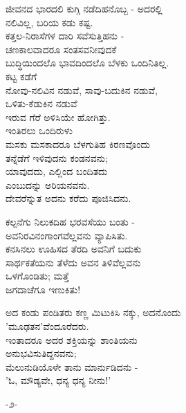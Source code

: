 \begin{myquote}
ಜೀವನದ ಭಾರದಲಿ ಕುಗ್ಗಿ ನಡೆದಿಹನೊಬ್ಬ - ಅದರಲ್ಲಿ\\ನಲಿವಿಲ್ಲ, ಬರಿಯ ಕಡು ಕಷ್ಟ.\\ಕತ್ತಲ-ನಿರಾಸೆಗಳ ದಾರಿ ಸವೆಸುತ್ತಿಹನು -\\ಚಣಕಾಲವಾದರೂ ಸಂತಸವನೀವುದಕೆ\\ಬುದ್ಧಿಯಿಂದಲೊ ಭಾವದಿಂದಲೊ ಬೆಳಕು ಒಂದಿನಿತಿಲ್ಲ.\\ಕಟ್ಟ ಕಡೆಗೆ\\ನೋವು-ನಲಿವಿನ ನಡುವೆ, ಸಾವು-ಬದುಕಿನ ನಡುವೆ,\\ಒಳಿತು-ಕೆಡುಕಿನ ನಡುವೆ\\ಇರುವ ಗೆರೆ ಅಳಿಸಿಯೇ ಹೋಗಿತ್ತು.\\ಇಂತಿರಲು ಒಂದಿರುಳು\\ಮಸಕು ಮಸಕಾದರೂ ಬೆಳಗುತಿಹ ಕಿರಣವೊಂದು\\ತನ್ನೆಡೆಗೆ ಇಳಿವುದನು ಕಂಡನವನು;\\ಯಾವುದದು, ಎಲ್ಲಿಂದ ಬಂದಿತದು\\ಎಂಬುದನ್ನು ಅರಿಯನವನು.\\ದೇವರೆನ್ನುತ ಅದನು ಕರೆದು ಪೂಜಿಸಿದನು.
\end{myquote}

\begin{myquote}
ಕಲ್ಪನೆಗು ನಿಲುಕದಿಹ ಭರವಸೆಯು ಬಂತು -\\ಅವನಿರವಿನಂಗಾಂಗವೆಲ್ಲವನು ವ್ಯಾಪಿಸಿತು.\\ಕನಸಿನಲು ಊಹಿಸದ ತೆರದಿ ಅವನಿಗೆ ಬದುಕು\\ಸಾರ್ಥಕತೆಯನು ತೆಳೆದು ಅವನ ತಿಳಿವೆಲ್ಲವನು\\ಒಳಗೊಂಡಿತು; ಮತ್ತೆ\\ಜಗದಾಚೆಗೂ ಇಣುಕಿತು!
\end{myquote}

\begin{myquote}
ಅದ ಕಂಡು ಪಂಡಿತರು ಕಣ್ಣ ಮಿಟುಕಿಸಿ ನಕ್ಕು, ಅದನೊಂದು\\'ಮೂಢತನ'ವೆಂದೂರೆದರು.\\ಇಂತಾದರೂ ಅದರ ಶಕ್ತಿಯನ್ನು ಶಾಂತಿಯನು\\ಅನುಭವಿಸುತಿದ್ದನವನು;\\ಮೆಲುನುಡಿಯೊಳೇ ತಾನು ಮಾರ್ನುಡಿದನು -\\'ಓ, ಮೌಡ್ಯವೇ, ಧನ್ಯ ಧನ್ಯ ನೀನು!'
\end{myquote}

\begin{center}
-೨-
\end{center}


